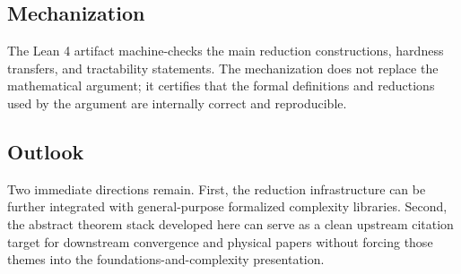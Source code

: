 \subsection*{Mechanization}

The Lean 4 artifact machine-checks the main reduction constructions, hardness transfers, and tractability statements. The mechanization does not replace the mathematical argument; it certifies that the formal definitions and reductions used by the argument are internally correct and reproducible.

\subsection*{Outlook}

Two immediate directions remain. First, the reduction infrastructure can be further integrated with general-purpose formalized complexity libraries. Second, the abstract theorem stack developed here can serve as a clean upstream citation target for downstream convergence and physical papers without forcing those themes into the foundations-and-complexity presentation.


\appendix
